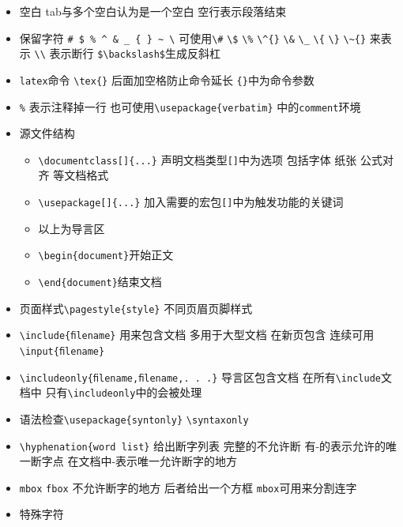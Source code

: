 \documentclass[
]{book}
\begin{document}
\begin{itemize}
\item
  空白 tab与多个空白认为是一个空白 空行表示段落结束
\item
  保留字符 \texttt{\#\ \$\ \%\ \^{}\ \&\ \_\ \{\ \}\ \textasciitilde{}\ \textbackslash{}} 可使用\texttt{\textbackslash{}\#} \texttt{\textbackslash{}\$} \texttt{\textbackslash{}\%} \texttt{\textbackslash{}\^{}\{\}} \texttt{\textbackslash{}\&} \texttt{\textbackslash{}\_} \texttt{\textbackslash{}\{} \texttt{\textbackslash{}\}} \texttt{\textbackslash{}\textasciitilde{}\{\}} 来表示 \texttt{\textbackslash{}\textbackslash{}} 表示断行 \texttt{\$\textbackslash{}backslash\$}生成反斜杠
\item
  \texttt{latex}命令 \texttt{\textbackslash{}tex\{\}} 后面加空格防止命令延长 \texttt{\{\}}中为命令参数
\item
  \texttt{\%} 表示注释掉一行 也可使用\texttt{\textbackslash{}usepackage\{verbatim\}} 中的\texttt{comment}环境
\item
  源文件结构

  \begin{itemize}
  \item
    \texttt{\textbackslash{}documentclass{[}{]}\{...\}} 声明文档类型\texttt{{[}{]}}中为选项 包括字体 纸张 公式对齐 等文档格式
  \item
    \texttt{\textbackslash{}usepackage{[}{]}\{...\}} 加入需要的宏包\texttt{{[}{]}}中为触发功能的关键词
  \item
    以上为导言区
  \item
    \texttt{\textbackslash{}begin\{document\}}开始正文
  \item
    \texttt{\textbackslash{}end\{document\}}结束文档
  \end{itemize}
\item
  页面样式\texttt{\textbackslash{}pagestyle\{style\}} 不同页眉页脚样式
\item
  \texttt{\textbackslash{}include\{ﬁlename\}} 用来包含文档 多用于大型文档 在新页包含 连续可用\texttt{\textbackslash{}input\{ﬁlename\}}
\item
  \texttt{\textbackslash{}includeonly\{ﬁlename,ﬁlename,.\ .\ .\}} 导言区包含文档 在所有\texttt{\textbackslash{}include}文档中 只有\texttt{\textbackslash{}includeonly}中的会被处理
\item
  语法检查\texttt{\textbackslash{}usepackage\{syntonly\}} \texttt{\textbackslash{}syntaxonly}
\item
  \texttt{\textbackslash{}hyphenation\{word\ list\}} 给出断字列表 完整的不允许断 有-的表示允许的唯一断字点 在文档中-表示唯一允许断字的地方
\item
  \texttt{mbox} \texttt{fbox} 不允许断字的地方 后者给出一个方框 \texttt{mbox}可用来分割连字
\item
  特殊字符


\end{itemize}
\end{document}
